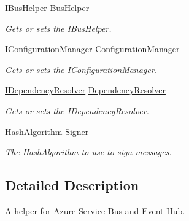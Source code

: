 \begin{DoxyCompactItemize}
\hyperlink{interfaceCqrs_1_1Bus_1_1IBusHelper}{I\+Bus\+Helper} \hyperlink{classCqrs_1_1Azure_1_1ServiceBus_1_1AzureBusHelper_a1a827b64ae73d8c368852e77dc94a2b1_a1a827b64ae73d8c368852e77dc94a2b1}{Bus\+Helper}
\begin{DoxyCompactList}\small\item\em Gets or sets the I\+Bus\+Helper. \end{DoxyCompactList}\item 
\hyperlink{interfaceCqrs_1_1Configuration_1_1IConfigurationManager}{I\+Configuration\+Manager} \hyperlink{classCqrs_1_1Azure_1_1ServiceBus_1_1AzureBusHelper_aae005b5dd2d891bfe8e959c6360ff5a4_aae005b5dd2d891bfe8e959c6360ff5a4}{Configuration\+Manager}
\begin{DoxyCompactList}\small\item\em Gets or sets the I\+Configuration\+Manager. \end{DoxyCompactList}\item 
\hyperlink{interfaceCqrs_1_1Configuration_1_1IDependencyResolver}{I\+Dependency\+Resolver} \hyperlink{classCqrs_1_1Azure_1_1ServiceBus_1_1AzureBusHelper_a39d23fe045229940190c71577a49b715_a39d23fe045229940190c71577a49b715}{Dependency\+Resolver}
\begin{DoxyCompactList}\small\item\em Gets or sets the I\+Dependency\+Resolver. \end{DoxyCompactList}\item 
Hash\+Algorithm \hyperlink{classCqrs_1_1Azure_1_1ServiceBus_1_1AzureBusHelper_ae01bc83b9283d35b4ecf3087503846d1_ae01bc83b9283d35b4ecf3087503846d1}{Signer}
\begin{DoxyCompactList}\small\item\em The Hash\+Algorithm to use to sign messages. \end{DoxyCompactList}\end{DoxyCompactItemize}


\subsection{Detailed Description}
A helper for \hyperlink{namespaceCqrs_1_1Azure}{Azure} Service \hyperlink{namespaceCqrs_1_1Bus}{Bus} and Event Hub. 


